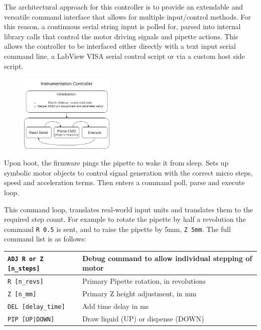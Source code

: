 The architectural approach for this controller is to provide an extendable and versatile command interface that allows for multiple input/control methods. For this reason, a continuous serial string input is polled for, parsed into internal library calls that control the motor driving signals and pipette actions. This allows the controller to be interfaced either directly with a text input serial command line, a LabView VISA serial control script or via a custom host side script.

\begin{figure}[h]
    \centering
    \includegraphics[width=0.4\textwidth]{img/software.png}
\end{figure}

Upon boot, the firmware pings the pipette to wake it from sleep. Sets up symbolic motor objects to control signal generation with the correct micro steps, speed and acceleration terms. Then enters a command poll, parse and execute loop.

This command loop, translates real-world input units and translates them to the required step count.
For example to rotate the pipette by half a revolution the command \texttt{R 0.5} is sent, and to raise the pipette by 5mm, \texttt{Z 5mm}. The full command list is as follows: 

\begin{table}[]
    \begin{tabular}{|l|l|}
    \hline
    \texttt{ADJ R or Z {[}n\_steps{]}} & Debug command to allow individual stepping of motor \\ \hline
    \texttt{R {[}n\_revs{]} }       & Primary Pipette rotation, in revolutions            \\ \hline
    \texttt{Z {[}n\_mm{]}          }& Primary Z height adjustment, in mm                  \\ \hline
    \texttt{DEL {[}delay\_time{]}  }& Add time delay in ms                                \\ \hline
    \texttt{PIP {[}UP|DOWN{]}      }& Draw liquid (UP) or dispense (DOWN)                 \\ \hline
    \end{tabular}
    \end{table}
    
